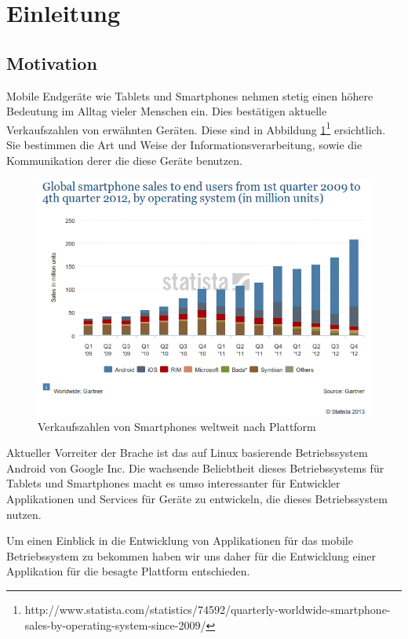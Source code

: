\section{Einleitung}
\subsection{Motivation}
Mobile Endgeräte wie Tablets und Smartphones nehmen stetig einen höhere Bedeutung im Alltag vieler Menschen ein. Dies bestätigen aktuelle Verkaufszahlen von erwähnten Geräten. Diese sind in Abbildung \ref{sale1}\footnote{http://www.statista.com/statistics/74592/quarterly-worldwide-smartphone-sales-by-operating-system-since-2009/} ersichtlich. Sie bestimmen die Art und Weise der Informationsverarbeitung, sowie die Kommunikation derer die diese Geräte benutzen.


\begin{figure}[h!t]
\begin{center}
\includegraphics[scale=0.6]{images/sale}
\caption{Verkaufszahlen von Smartphones weltweit nach Plattform}
\label{sale1}
\end{center}
\end{figure}


Aktueller Vorreiter der Brache ist das auf Linux basierende Betriebssystem Android von Google Inc. Die wachsende Beliebtheit dieses Betriebssystems für Tablets und Smartphones macht es umso interessanter für Entwickler Applikationen und Services für Geräte zu entwickeln, die dieses Betriebssystem nutzen.

Um einen Einblick in die Entwicklung von Applikationen für das mobile Betriebssystem zu bekommen haben wir uns daher für die Entwicklung einer Applikation für die besagte Plattform entschieden.

